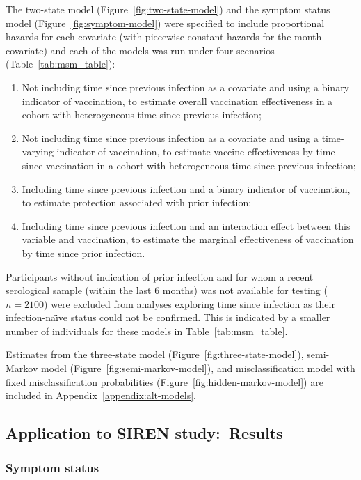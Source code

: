 The two-state model (Figure~\ref{fig:two-state-model}) and the symptom status model (Figure~\ref{fig:symptom-model}) were specified to include proportional hazards for each covariate (with piecewise-constant hazards for the month covariate) and each of the models was run under four scenarios (Table~\ref{tab:msm_table}):
%
\begin{enumerate}
    \item Not including time since previous infection as a covariate and using a binary indicator of vaccination, to estimate overall vaccination effectiveness in a cohort with heterogeneous time since previous infection;
    \item Not including time since previous infection as a covariate and using a time-varying indicator of vaccination, to estimate vaccine effectiveness by time since vaccination in a cohort with heterogeneous time since previous infection;
    \item Including time since previous infection and a binary indicator of vaccination, to estimate protection associated with prior infection;
    \item Including time since previous infection and an interaction effect between this variable and vaccination, to estimate the marginal effectiveness of vaccination by time since prior infection.
\end{enumerate}

Participants without indication of prior infection and for whom a recent serological sample (within the last 6 months) was not available for testing ($n = 2100$) were excluded from analyses exploring time since infection as their infection-na\"{\i}ve status could not be confirmed. This is indicated by a smaller number of individuals for these models in Table~\ref{tab:msm_table}.



Estimates from the three-state model (Figure~\ref{fig:three-state-model}), semi-Markov model (Figure~\ref{fig:semi-markov-model}), and misclassification model with fixed misclassification probabilities (Figure~\ref{fig:hidden-markov-model}) are included in Appendix~\ref{appendix:alt-models}.

\subsection{Application to SIREN study:\ Results}

\subsubsection{Symptom status}

